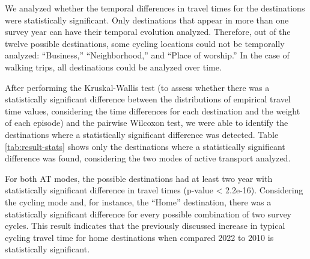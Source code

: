 \documentclass[preprint, 3p,
authoryear]{elsarticle} %
\begin{document}
We analyzed whether the temporal differences in travel times for the
destinations were statistically significant. Only destinations that
appear in more than one survey year can have their temporal evolution
analyzed. Therefore, out of the twelve possible destinations, some
cycling locations could not be temporally analyzed: ``Business,''
``Neighborhood,'' and ``Place of worship.'' In the case of walking
trips, all destinations could be analyzed over time.

After performing the Kruskal-Wallis test (to assess whether there was a
statistically significant difference between the distributions of
empirical travel time values, considering the time differences for each
destination and the weight of each episode) and the pairwise Wilcoxon
test, we were able to identify the destinations where a statistically
significant difference was detected. Table \ref{tab:result-stats} shows
only the destinations where a statistically significant difference was
found, considering the two modes of active transport analyzed.

For both AT modes, the possible destinations had at least two year with
statistically significant difference in travel times (p-value
\textless{} 2.2e-16). Considering the cycling mode and, for instance,
the ``Home'' destination, there was a statistically significant
difference for every possible combination of two survey cycles. This
result indicates that the previously discussed increase in typical
cycling travel time for home destinations when compared 2022 to 2010 is
statistically significant.
\end{document}
